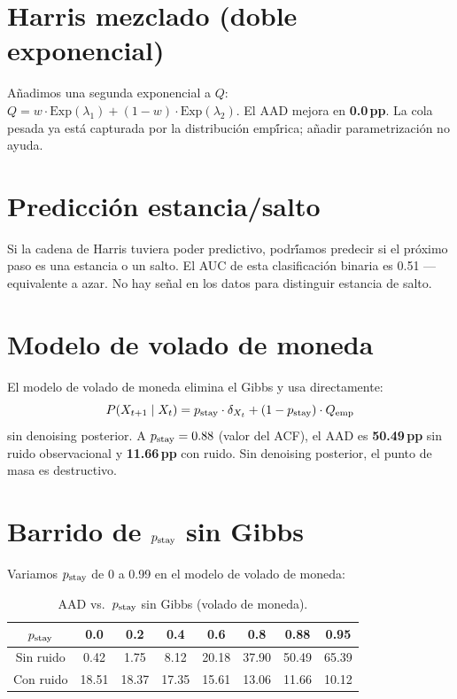 \section{Harris mezclado (doble exponencial)}

A\~{n}adimos una segunda exponencial a $Q$: $Q = w \cdot \text{Exp}(\lambda_1) + (1-w) \cdot \text{Exp}(\lambda_2)$.
El AAD mejora en \textbf{0.0\,pp}. La cola pesada ya est\'{a} capturada por la
distribuci\'{o}n emp\'{\'i}rica; a\~{n}adir parametrizaci\'{o}n no ayuda.

\section{Predicci\'{o}n estancia/salto}

Si la cadena de Harris tuviera poder predictivo, podr\'{\'i}amos predecir si el
pr\'{o}ximo paso es una estancia o un salto. El AUC de esta clasificaci\'{o}n binaria
es 0.51 --- equivalente a azar. No hay se\~{n}al en los datos para distinguir
estancia de salto.

\section{Modelo de volado de moneda}

El modelo de volado de moneda elimina el Gibbs y usa directamente:
\begin{equation}
    P(X_{t+1} \mid X_t) = p_{\text{stay}} \cdot \delta_{X_t} + (1 - p_{\text{stay}}) \cdot Q_{\text{emp}}
\end{equation}
sin denoising posterior. A $p_{\text{stay}} = 0.88$ (valor del ACF), el AAD es
\textbf{50.49\,pp} sin ruido observacional y \textbf{11.66\,pp} con ruido.
Sin denoising posterior, el punto de masa es destructivo.

\section{Barrido de $p_{\text{stay}}$ sin Gibbs}

Variamos $p_{\text{stay}}$ de 0 a 0.99 en el modelo de volado de moneda:

\begin{table}[h]
\centering
\caption{AAD vs.\ $p_{\text{stay}}$ sin Gibbs (volado de moneda).}
\begin{tabular}{cccccccc}
\toprule
$p_{\text{stay}}$ & 0.0 & 0.2 & 0.4 & 0.6 & 0.8 & 0.88 & 0.95 \\
\midrule
Sin ruido & 0.42 & 1.75 & 8.12 & 20.18 & 37.90 & 50.49 & 65.39 \\
Con ruido & 18.51 & 18.37 & 17.35 & 15.61 & 13.06 & 11.66 & 10.12 \\
\bottomrule
\end{tabular}
\end{table}

